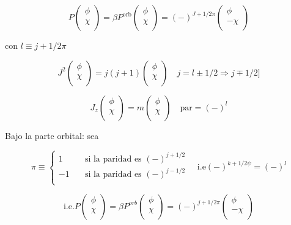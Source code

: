 \documentclass{report}
\begin{document}
\[P \left ( \begin{array}{cc}
 \phi   \\
 \chi   \\
 \end{array} \right) = \beta P^{\text{orb}} \left ( \begin{array}{cc}
 \phi   \\
 \chi   \\
 \end{array} \right) = (-) ^{J + 1/2 \pi} \left ( \begin{array}{cc}
 \phi   \\
 -\chi   \\
 \end{array} \right)\]

con $l \equiv j + 1/2 \pi$

\[J^2 \left ( \begin{array}{cc}
 \phi   \\
 \chi   \\
 \end{array} \right) = j (j+1) \left ( \begin{array}{cc}
 \phi   \\
 \chi   \\
 \end{array} \right) \quad j = l \pm 1/2 \Rightarrow j \mp 1/2]\]

\[J_z \left ( \begin{array}{cc}
 \phi   \\
 \chi   \\
 \end{array} \right) = m \left ( \begin{array}{cc}
 \phi   \\
 \chi   \\
 \end{array} \right) \quad \text{par} = (-)^l\]

Bajo la parte orbital: sea 

\[\pi \equiv  \begin{cases}
    1       & \quad \text{si la paridad es } (-)^{j+1/2}\\
   -1       & \quad \text{si la paridad es } (-)^{j-1/2}\\
  \end{cases} \quad \text{i.e} (-)^{k+1/2 \psi} = (-)^l\]

\[\text{i.e.} P \left ( \begin{array}{cc}
 \phi   \\
 \chi   \\
 \end{array} \right) = \beta P^{orb} \left ( \begin{array}{cc}
 \phi   \\
 \chi   \\
 \end{array} \right) = (-)^{j+1/2 \pi} \left ( \begin{array}{cc}
 \phi   \\
 -\chi   \\
 \end{array} \right)\]
\end{document}
